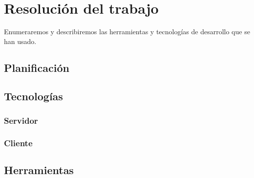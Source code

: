 \chapter{Resolución del trabajo}

\bigskip
Enumeraremos y describiremos las herramientas y tecnologías de desarrollo que se han usado.


\section{Planificación}


\newpage
\section{Tecnologías}

\subsection{Servidor}

\subsection{Cliente}



\newpage
\section{Herramientas}





